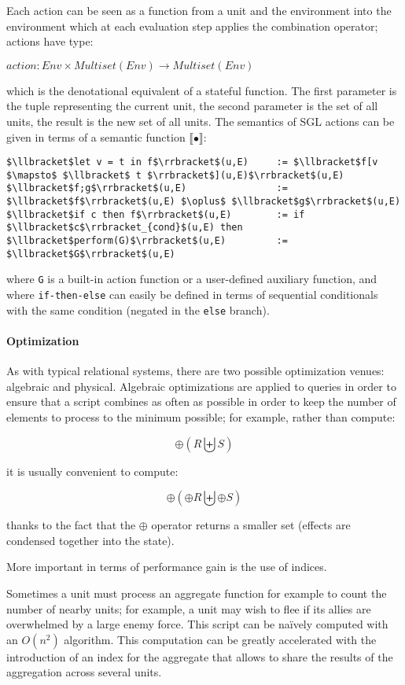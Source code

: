 Each action can be seen as a function from a unit and the environment into the environment which at each evaluation step applies the combination operator; actions have type:

$action : Env \times Multiset(Env) \rightarrow Multiset(Env)$

which is the denotational equivalent of a stateful function. The first parameter is the tuple representing the current unit, the second parameter is the set of all units, the result is the new set of all units. The semantics of SGL actions can be given in terms of a semantic function $\llbracket \bullet \rrbracket$:

\begin{lstlisting}
$\llbracket$let v = t in f$\rrbracket$(u,E) 	:= $\llbracket$f[v $\mapsto$ $\llbracket$ t $\rrbracket$](u,E)$\rrbracket$(u,E)
$\llbracket$f;g$\rrbracket$(u,E)             	:= $\llbracket$f$\rrbracket$(u,E) $\oplus$ $\llbracket$g$\rrbracket$(u,E)
$\llbracket$if c then f$\rrbracket$(u,E)     	:= if $\llbracket$c$\rrbracket_{cond}$(u,E) then
$\llbracket$perform(G)$\rrbracket$(u,E)     	:= $\llbracket$G$\rrbracket$(u,E)
\end{lstlisting}

where \texttt{G} is a built-in action function or a user-defined auxiliary function, and where \texttt{if-then-else} can easily be defined in terms of sequential conditionals with the same condition (negated in the \texttt{else} branch).

\paragraph{Optimization}
As with typical relational systems, there are two possible optimization venues: algebraic and physical. Algebraic optimizations are applied to queries in order to ensure that a script combines as often as possible in order to keep the number of elements to process to the minimum possible; for example, rather than compute:

$$\oplus(R \biguplus S)$$

it is usually convenient to compute:

$$\oplus(\oplus R \biguplus \oplus S)$$

thanks to the fact that the $\oplus$ operator returns a smaller set (effects are condensed together into the state).

More important in terms of performance gain is the use of indices.

Sometimes a unit must process an aggregate function for example to count the number of nearby units; for example, a unit may wish to flee if its allies are overwhelmed by a large enemy force. This script can be na\"ively computed with an $O(n^2)$ algorithm. This computation can be greatly accelerated with the introduction of an index for the aggregate that allows to share the results of the aggregation across several units.

